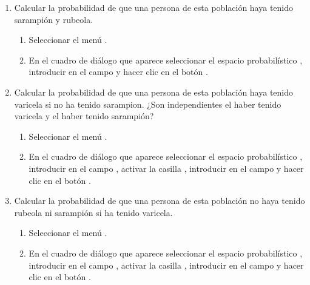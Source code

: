 \begin{enumerate}[leftmargin=*]
\begin{enumerate}
\item Calcular la probabilidad de que una persona de esta población haya tenido sarampión y rubeola. 
\begin{indicacion}{
\begin{enumerate}
\item Seleccionar el menú .
\item En el cuadro de diálogo que aparece seleccionar el espacio probabilístico , introducir
 en el campo  y hacer clic en el botón .
\end{enumerate}
}
\end{indicacion} 

\item Calcular la probabilidad de que una persona de esta población haya tenido varicela si no ha tenido sarampion.
¿Son independientes el haber tenido varicela y el haber tenido sarampión? 
\begin{indicacion}{
\begin{enumerate}
\item Seleccionar el menú .
\item En el cuadro de diálogo que aparece seleccionar el espacio probabilístico , introducir
 en el campo , activar la casilla , introducir  en el campo  y hacer clic en el botón .
\end{enumerate}
}
\end{indicacion} 

\item Calcular la probabilidad de que una persona de esta población no haya tenido rubeola ni sarampión si ha tenido varicela. 
\begin{indicacion}{
\begin{enumerate}
\item Seleccionar el menú .
\item En el cuadro de diálogo que aparece seleccionar el espacio probabilístico , introducir
 en el campo , activar la casilla , introducir
 en el campo  y hacer clic en el botón .
\end{enumerate}
}
\end{indicacion} 
\end{enumerate}


\end{enumerate}
